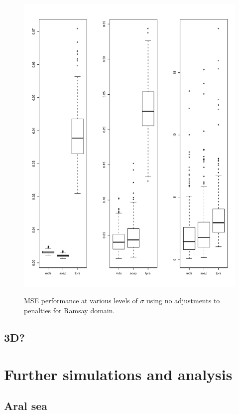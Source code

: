 \documentclass[a4paper,10pt]{article}
\begin{document}
\begin{figure}
\centering
\includegraphics[width=6in]{su-figs/ramsay-mds-boxplots.pdf} \\
\caption{MSE performance at various levels of $\sigma$ using no adjustments to penalties for Ramsay domain.}
\label{ramsay-boxplots-old}
\end{figure}




\subsection{3D?}

\section{Further simulations and analysis}

\subsection{Aral sea}
\end{document}
